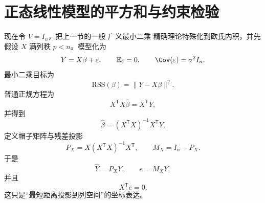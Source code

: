\section{正态线性模型的平方和与约束检验}

\begin{definition}[普通最小二乘与帽子矩阵]
现在令 $V=I_n$，把上一节的一般 广义最小二乘 精确理论特殊化到欧氏内积，并先假设 $X$ 满列秩 $p<n$。模型化为
\[
 Y=X\beta+\varepsilon,
 \qquad
 \mathbb E\varepsilon=0,
 \qquad
 \Cov(\varepsilon)=\sigma^2I_n.
\]
最小二乘目标为
\[
 \mathrm{RSS}(\beta)=\|Y-X\beta\|^2.
\]
普通正规方程为
\begin{equation*}X^{\mathsf T}X\widehat\beta=X^{\mathsf T}Y,
\end{equation*}
并得到
\begin{equation}\label{eq:math-stat-ols-beta}
 \widehat\beta
 =(X^{\mathsf T}X)^{-1}X^{\mathsf T}Y.
\end{equation}
定义帽子矩阵与残差投影
\begin{equation*}P_X=X(X^{\mathsf T}X)^{-1}X^{\mathsf T},
 \qquad
 M_X=I_n-P_X.
\end{equation*}
于是
\[
 \widehat Y=P_XY,
 \qquad
 e=M_XY,
\]
并且
\begin{equation*}X^{\mathsf T}e=0.
\end{equation*}
这只是“最短距离投影到列空间”的坐标表达。
\end{definition}

